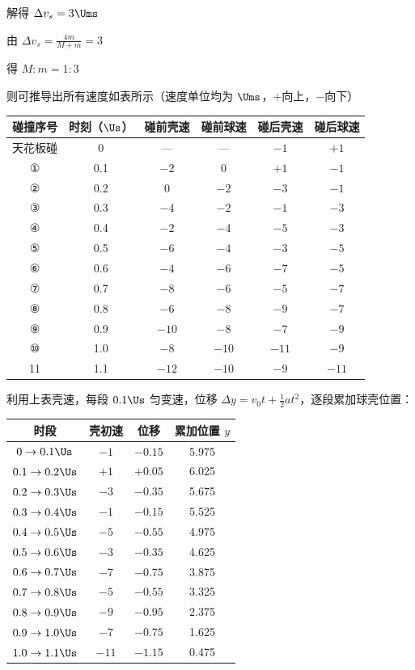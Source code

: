 \documentclass[\gkver]{gaokaozhenti}
\begin{document}
\begin{enumerate}
{解得 $\Delta v_{s}=3\Ums$

由 $\Delta v_{s}=\frac{4m}{M+m}=3$

得 $M:m=1:3$

则可推导出所有速度如表所示（速度单位均为 $\Ums$，+向上，$-$向下）

\begin{center}
\begin{tabular}{|c|c|c|c|c|c|}
\hline
碰撞序号 & 时刻（$\Us$） & 碰前壳速 & 碰前球速 & 碰后壳速 & 碰后球速 \\
\hline
天花板碰 & 0 & --- & --- & $-1$ & $+1$ \\
\hline
① & 0.1 & $-2$ & 0 & $+1$ & $-1$ \\
\hline
② & 0.2 & 0 & $-2$ & $-3$ & $-1$ \\
\hline
③ & 0.3 & $-4$ & $-2$ & $-1$ & $-3$ \\
\hline
④ & 0.4 & $-2$ & $-4$ & $-5$ & $-3$ \\
\hline
⑤ & 0.5 & $-6$ & $-4$ & $-3$ & $-5$ \\
\hline
⑥ & 0.6 & $-4$ & $-6$ & $-7$ & $-5$ \\
\hline
⑦ & 0.7 & $-8$ & $-6$ & $-5$ & $-7$ \\
\hline
⑧ & 0.8 & $-6$ & $-8$ & $-9$ & $-7$ \\
\hline
⑨ & 0.9 & $-10$ & $-8$ & $-7$ & $-9$ \\
\hline
⑩ & 1.0 & $-8$ & $-10$ & $-11$ & $-9$ \\
\hline
11 & 1.1 & $-12$ & $-10$ & $-9$ & $-11$ \\
\hline
\end{tabular}
\end{center}

利用上表壳速，每段 $0.1\Us$ 匀变速，位移 $\Delta y=v_{0}t+\frac{1}{2}at^{2}$，逐段累加球壳位置：

\begin{center}
\begin{tabular}{|c|c|c|c|}
\hline
时段 & 壳初速 & 位移 & 累加位置 $y$ \\
\hline
$0\rightarrow0.1\Us$ & $-1$ & $-0.15$ & 5.975 \\
\hline
$0.1\rightarrow0.2\Us$ & $+1$ & $+0.05$ & 6.025 \\
\hline
$0.2\rightarrow0.3\Us$ & $-3$ & $-0.35$ & 5.675 \\
\hline
$0.3\rightarrow0.4\Us$ & $-1$ & $-0.15$ & 5.525 \\
\hline
$0.4\rightarrow0.5\Us$ & $-5$ & $-0.55$ & 4.975 \\
\hline
$0.5\rightarrow0.6\Us$ & $-3$ & $-0.35$ & 4.625 \\
\hline
$0.6\rightarrow0.7\Us$ & $-7$ & $-0.75$ & 3.875 \\
\hline
$0.7\rightarrow0.8\Us$ & $-5$ & $-0.55$ & 3.325 \\
\hline
$0.8\rightarrow0.9\Us$ & $-9$ & $-0.95$ & 2.375 \\
\hline
$0.9\rightarrow1.0\Us$ & $-7$ & $-0.75$ & 1.625 \\
\hline
$1.0\rightarrow1.1\Us$ & $-11$ & $-1.15$ & 0.475 \\
\hline
\end{tabular}
\end{center}

}
\end{enumerate}
\end{document}
